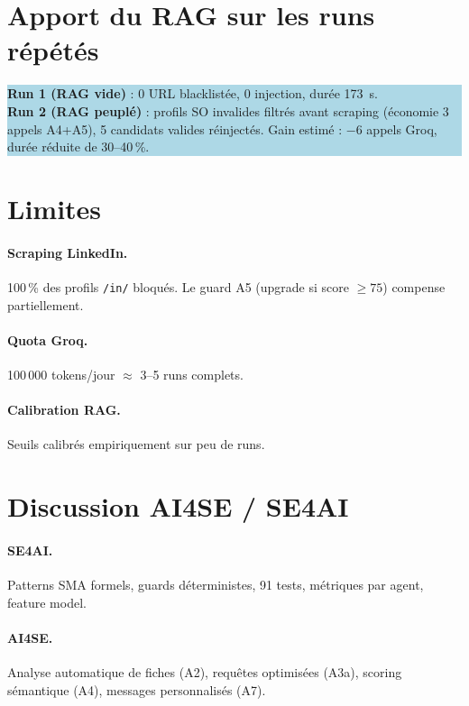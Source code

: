 \documentclass[12pt,a4paper]{report}
\begin{document}
\section{Apport du RAG sur les runs répétés}

\medskip
\colorbox{lightblue}{\parbox{0.95\textwidth}{
\smallskip
\textbf{\color{primary}Run 1 (RAG vide)} : 0 URL blacklistée, 0 injection, durée 173~s.\\[4pt]
\textbf{\color{primary}Run 2 (RAG peuplé)} : profils SO invalides filtrés avant scraping
(économie 3 appels A4+A5), 5 candidats valides réinjectés.
Gain estimé : $-$6 appels Groq, durée réduite de 30--40\,\%.
\smallskip
}}
\medskip

\section{Limites}

\paragraph{Scraping LinkedIn.} 100\,\% des profils \texttt{/in/} bloqués.
Le guard A5 (upgrade si score $\geq 75$) compense partiellement.

\paragraph{Quota Groq.} 100\,000 tokens/jour $\approx$ 3--5 runs complets.

\paragraph{Calibration RAG.} Seuils calibrés empiriquement sur peu de runs.

\section{Discussion AI4SE / SE4AI}

\paragraph{SE4AI.} Patterns SMA formels, guards déterministes, 91 tests,
métriques par agent, feature model.

\paragraph{AI4SE.} Analyse automatique de fiches (A2), requêtes optimisées (A3a),
scoring sémantique (A4), messages personnalisés (A7).
\end{document}

